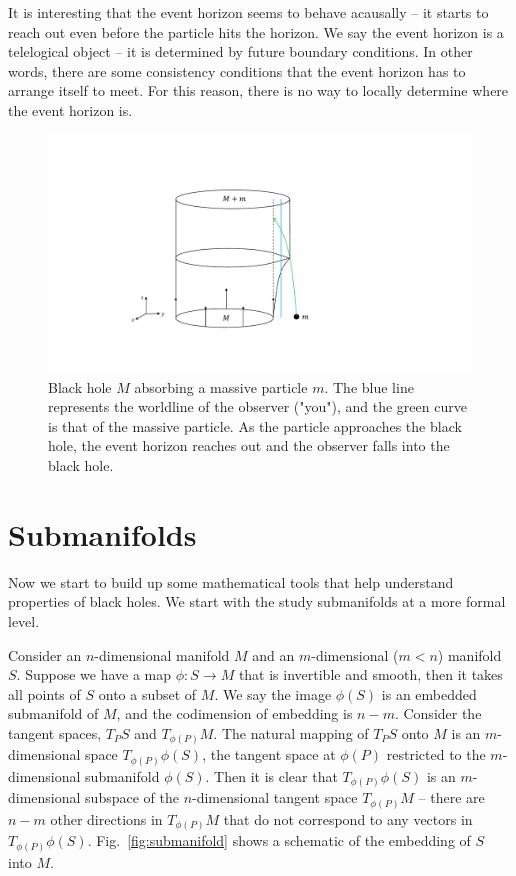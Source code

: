 \documentclass[11pt,table]{article}
\begin{document}
It is interesting that the event horizon seems to behave acausally -- it starts to reach out even before the particle hits the horizon. We say the event horizon is a telelogical object -- it is determined by future boundary conditions. In other words, there are some consistency conditions that the event horizon has to arrange itself to meet. For this reason, there is no way to locally determine where the event horizon is.

\begin{figure}[H]
\centering
\includegraphics[width=0.6\linewidth]{bh_absorb.pdf}
\caption{Black hole $M$ absorbing a massive particle $m$. The blue line represents the worldline of the observer ("you"), and the green curve is that of the massive particle. As the particle approaches the black hole, the event horizon reaches out and the observer falls into the black hole.} \label{fig:bh_absorb}
\end{figure}

\section{Submanifolds}

Now we start to build up some mathematical tools that help understand properties of black holes. We start with the study submanifolds at a more formal level.

Consider an $n$-dimensional manifold $M$ and an $m$-dimensional ($m<n$) manifold $S$. Suppose we have a map $\phi: S\to M$ that is invertible and smooth, then it takes all points of $S$ onto a subset of $M$. We say the image $\phi(S)$ is an embedded submanifold of $M$, and the codimension of embedding is $n-m$. Consider the tangent spaces, $T_P S$ and $T_{\phi(P)}M$. The natural mapping of $T_P S$ onto $M$ is an $m$-dimensional space $T_{\phi(P)}\phi(S)$, the tangent space at $\phi(P)$ restricted to the $m$-dimensional submanifold $\phi(S)$. Then it is clear that $T_{\phi(P)}\phi(S)$ is an $m$-dimensional subspace of the $n$-dimensional tangent space $T_{\phi(P)}M$ -- there are $n-m$ other directions in $T_{\phi(P)}M$ that do not correspond to any vectors in $T_{\phi(P)}\phi(S)$. Fig.~\ref{fig:submanifold} shows a schematic of the embedding of $S$ into $M$.
\end{document}
